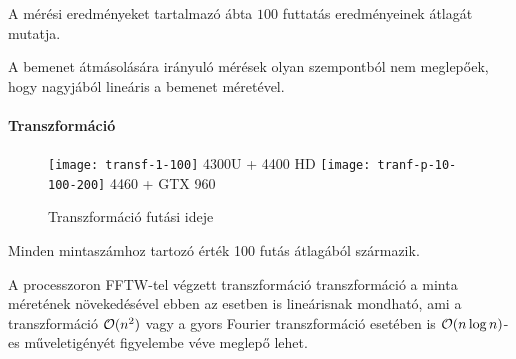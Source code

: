 A m\'er\'esi eredm\'enyeket tartalmaz\'o \'abta $100$ futtat\'as eredm\'enyeinek \'atlag\'at mutatja.

A bemenet \'atm\'asol\'as\'ara ir\'anyul\'o m\'er\'esek olyan szempontb\'ol nem meglep\H oek, hogy nagyj\'ab\'ol line\'aris a bemenet m\'eret\'evel.

\paragraph{Transzform\'aci\'o}

\begin{figure}[h]
	\texttt{[image: transf-1-100]}
	{4300U + 4400 HD}
	\texttt{[image: tranf-p-10-100-200]}
	{4460 + GTX 960}
	\centering
	\caption{Transzform\'aci\'o fut\'asi ideje}
\end{figure}

Minden mintasz\'amhoz tartoz\'o \'ert\'ek 100 fut\'as \'atlag\'ab\'ol sz\'armazik.

A processzoron FFTW-tel v\'egzett transzform\'aci\'o transzform\'aci\'o a minta m\'eret\'enek n\"oveked\'es\'evel ebben az esetben is line\'arisnak mondhat\'o, ami a transzform\'aci\'o $\mathcal{O}(n^2)$ vagy a gyors Fourier transzform\'aci\'o eset\'eben is $\mathcal{O}(n\log{n})$-es m\H uveletig\'eny\'et figyelembe v\'eve meglep\H o lehet.

